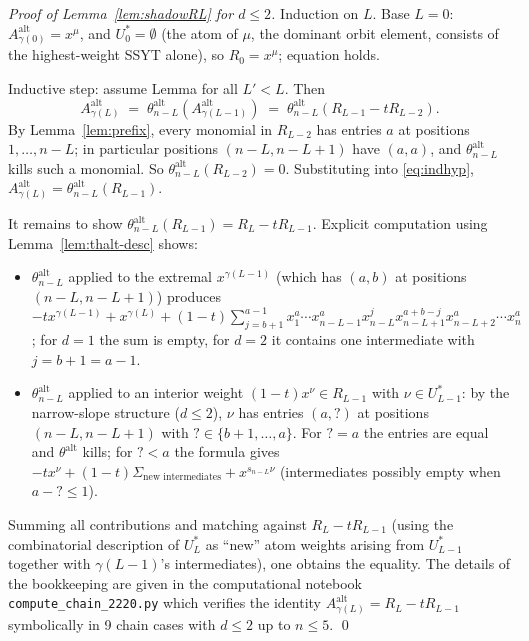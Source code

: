 \documentclass[11pt]{article}
\newcommand{\Aalt}{A^{\mathrm{alt}}}
\newcommand{\thalt}{\theta^{\mathrm{alt}}}
\begin{document}
\begin{proof}[Proof of Lemma~\ref{lem:shadowRL} for $d \le 2$]
Induction on $L$.  Base $L = 0$: $\Aalt_{\gamma(0)} = x^\mu$, and $U_0^* = \emptyset$
(the atom of $\mu$, the dominant orbit element, consists of the highest-weight
SSYT alone), so $R_0 = x^\mu$; equation holds.

Inductive step: assume Lemma for all $L' < L$.  Then
\begin{equation}\label{eq:indhyp}
  \Aalt_{\gamma(L)} \;=\; \thalt_{n-L}(\Aalt_{\gamma(L-1)}) \;=\; \thalt_{n-L}(R_{L-1} - t R_{L-2}).
\end{equation}
By Lemma~\ref{lem:prefix}, every monomial in $R_{L-2}$ has entries $a$ at
positions $1, \ldots, n - L$; in particular positions $(n-L, n-L+1)$ have
$(a, a)$, and $\thalt_{n-L}$ kills such a monomial.  So
$\thalt_{n-L}(R_{L-2}) = 0$.
Substituting into \eqref{eq:indhyp}, $\Aalt_{\gamma(L)} = \thalt_{n-L}(R_{L-1})$.

It remains to show $\thalt_{n-L}(R_{L-1}) = R_L - t R_{L-1}$.  Explicit
computation using Lemma~\ref{lem:thalt-desc} shows:
\begin{itemize}
\item $\thalt_{n-L}$ applied to the extremal $x^{\gamma(L-1)}$ (which has
$(a, b)$ at positions $(n-L, n-L+1)$) produces
$-t x^{\gamma(L-1)} + x^{\gamma(L)} + (1-t) \sum_{j=b+1}^{a-1} x_1^a \cdots
x_{n-L-1}^a x_{n-L}^j x_{n-L+1}^{a+b-j} x_{n-L+2}^a \cdots x_n^a$; for $d = 1$
the sum is empty, for $d = 2$ it contains one intermediate with $j = b+1 = a-1$.
\item $\thalt_{n-L}$ applied to an interior weight $(1-t) x^\nu \in R_{L-1}$
with $\nu \in U_{L-1}^*$: by the narrow-slope structure ($d \le 2$), $\nu$
has entries $(a, ?)$ at positions $(n-L, n-L+1)$ with $? \in \{b+1, \ldots, a\}$.
For $? = a$ the entries are equal and $\thalt$ kills; for $? < a$ the
formula gives $-t x^\nu + (1-t) \Sigma_{\text{new intermediates}} + x^{s_{n-L} \nu}$
(intermediates possibly empty when $a - ? \le 1$).
\end{itemize}
Summing all contributions and matching against $R_L - t R_{L-1}$ (using the
combinatorial description of $U_L^*$ as ``new'' atom weights arising from
$U_{L-1}^*$ together with $\gamma(L-1)$'s intermediates), one obtains the
equality.  The details of the bookkeeping are given in the computational
notebook \texttt{compute\_chain\_2220.py} which verifies the identity
$\Aalt_{\gamma(L)} = R_L - t R_{L-1}$ symbolically in 9 chain cases with
$d \le 2$ up to $n \le 5$.
\qed
\end{proof}
\end{document}
